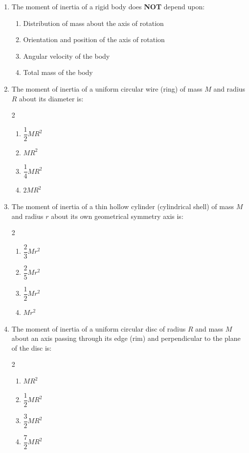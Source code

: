 \documentclass[11pt,a4paper]{article}
\begin{document}
\begin{enumerate}[label=\textbf{Q\arabic*.},leftmargin=24pt,itemsep=12pt]

  \item The moment of inertia of a rigid body does \textbf{NOT} depend upon:
  \begin{enumerate}[label=(\Alph*),itemsep=2pt]
    \item Distribution of mass about the axis of rotation
    \item Orientation and position of the axis of rotation
    \item Angular velocity of the body
    \item Total mass of the body
  \end{enumerate}

  \item The moment of inertia of a uniform circular wire (ring) of mass $M$ and radius $R$ about its diameter is:
  \begin{multicols}{2}
  \begin{enumerate}[label=(\Alph*),itemsep=2pt]
    \item $\dfrac{1}{2} M R^2$
    \item $M R^2$
    \item $\dfrac{1}{4} M R^2$
    \item $2 M R^2$
  \end{enumerate}
  \end{multicols}

  \item The moment of inertia of a thin hollow cylinder (cylindrical shell) of mass $M$ and radius $r$ about its own geometrical symmetry axis is:
  \begin{multicols}{2}
  \begin{enumerate}[label=(\Alph*),itemsep=2pt]
    \item $\dfrac{2}{3} M r^2$
    \item $\dfrac{2}{5} M r^2$
    \item $\dfrac{1}{2} M r^2$
    \item $M r^2$
  \end{enumerate}
  \end{multicols}

  \item The moment of inertia of a uniform circular disc of radius $R$ and mass $M$ about an axis passing through its edge (rim) and perpendicular to the plane of the disc is:
  \begin{multicols}{2}
  \begin{enumerate}[label=(\Alph*),itemsep=2pt]
    \item $M R^2$
    \item $\dfrac{1}{2} M R^2$
    \item $\dfrac{3}{2} M R^2$
    \item $\dfrac{7}{2} M R^2$
  \end{enumerate}
  \end{multicols}


\end{enumerate}
\end{document}
